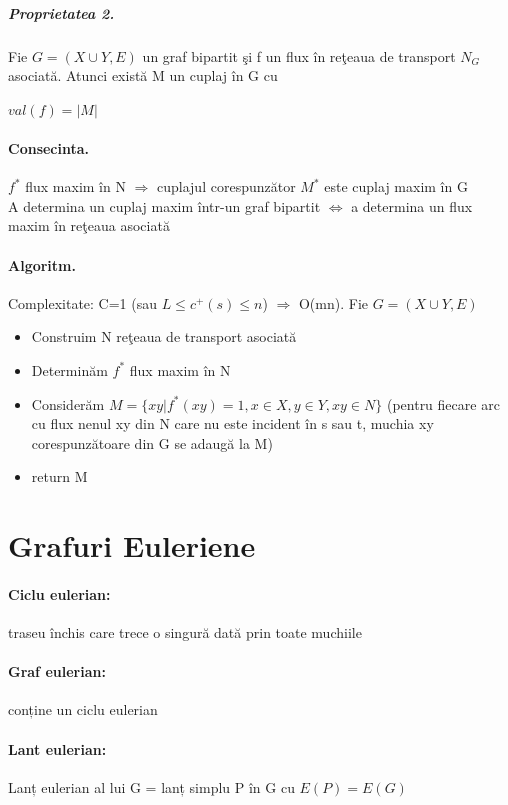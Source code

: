 \documentclass{article}
\begin{document}
\subparagraph*{Proprietatea 2.} Fie $G=(X \cup Y, E)$ un graf bipartit şi f un flux în reţeaua de transport $N_G$ asociată. Atunci există M un cuplaj în G cu
\begin{center}
    $val(f) = |M|$
\end{center}

\paragraph*{Consecinta.} $f^*$ flux maxim în N $\Rightarrow$ cuplajul corespunzător $M^*$ este cuplaj maxim în G \\
A determina un cuplaj maxim într-un graf bipartit $\Leftrightarrow$ a determina un flux maxim în reţeaua asociată

\paragraph*{Algoritm.} Complexitate: C=1 (sau $L \leq c^+(s) \leq n$) $\Rightarrow$ O(mn). Fie $G = (X \cup Y, E)$
\begin{itemize}
    \item Construim N reţeaua de transport asociată
    \item Determinăm $f^*$ flux maxim în N
    \item Considerăm $M = \{xy| f^*(xy)=1, x \in X, y \in Y, xy \in N \}$ (pentru fiecare arc cu flux nenul xy din N care nu este incident în s sau t, muchia xy corespunzătoare din G se adaugă la M)
    \item return M
\end{itemize}

\section{Grafuri Euleriene}
\paragraph*{Ciclu eulerian:} traseu închis care trece o singură dată prin toate muchiile
\paragraph*{Graf eulerian:} conține un ciclu eulerian
\paragraph*{Lant eulerian:} Lanț eulerian al lui G = lanț simplu P în G cu $E(P) = E(G)$
\end{document}

